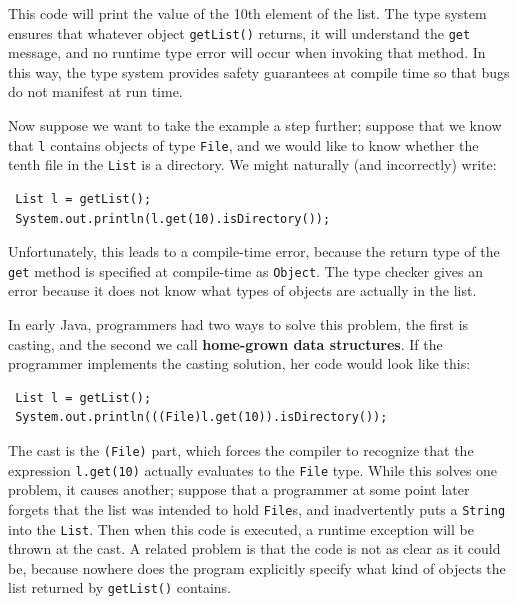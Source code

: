 \documentclass{svjour3}
\newcommand{\code}[1]{\texttt{#1}}
\begin{document}
\noindent
This code will print the value of the 10th element of the list.
The type system ensures that whatever object \code{getList()} returns,
it will understand the \code{get} message, and no runtime type error will occur
when invoking that method.
In this way, the type system provides safety guarantees at compile time so that
bugs do not manifest at run time.

Now suppose we want to take the example a step further; suppose that we know
that \code{l} contains objects of type \code{File}, and we would like to know
whether the tenth file in the \code{List} is a directory.
We might naturally (and incorrectly) write:

\begin{lstlisting}
 List l = getList();
 System.out.println(l.get(10).isDirectory());
\end{lstlisting}

\noindent
Unfortunately, this leads to a compile-time error, because
the return type of the \code{get} method is specified at compile-time as 
\code{Object}.
The type checker gives an error because it does not know what types of
objects are actually in the list.

In early Java, programmers had two ways to solve
this problem, the first is casting, and the second we
call \textbf{home-grown data structures}. 
If the programmer implements the casting solution, her code would look like
this:

\begin{lstlisting}
 List l = getList();
 System.out.println(((File)l.get(10)).isDirectory());
\end{lstlisting}

\noindent
The cast is the \code{(File)} part, which forces the
compiler to recognize that the expression \code{l.get(10)} 
actually evaluates to the \code{File} type.
While this solves one problem, it causes another;
suppose that a programmer at some point later forgets 
that the list was intended to hold
\code{File}s, and inadvertently puts a
\code{String} into the \code{List}.
Then when this code is executed, a runtime exception will be thrown 
at the cast.
A related problem is that the code is not as clear as it could
be, because nowhere does the program explicitly specify what kind of objects the list
returned by \code{getList()} contains.
\end{document}
